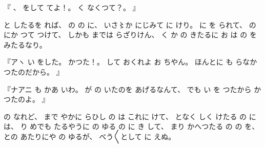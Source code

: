 %
『
、
%
をして
てよ！。
%
く
なくつて？。
』

%
と
したるを
れば、
%
の
の
に、
%
いさ〻か%
にじみて
に
けり。
%
に
を%
られて、
%
の
にか
つて
つけて、
%
しかも
までは
らざりけん、
%
く
か%
の
きたるに
お
は
の
を
みたるなり。

%
『アヽ
い
をした。
%
かつた！。
%
して%
おくれよ
お
ちやん。
%
ほんとに
も
らなかつたのだから。
』

%
『ナアニ
も
かあ
いわ。
%
が
の
いたのを
あげるなんて、
%
でも
い
を
つたから
かつたのよ。
』

%
の
なれど、
%
まで
やかに
らひし
の
は
これに
けて、
%
となく
しく
けたる
の
には、
%
り
めでも
たるやうに
の
ゆる
の
に
き%
して、
%
まり
かへつたる
の
の
を、
%
との
あたりにや
の
ゆるが、
%
べう〳〵として
に
えぬ。
